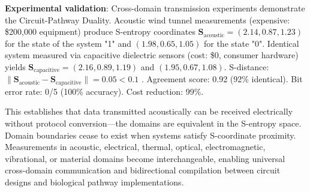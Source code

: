 \documentclass{article}
\theoremstyle{definition}
\theoremstyle{remark}
\begin{document}
\textbf{Experimental validation}: Cross-domain transmission experiments demonstrate the Circuit-Pathway Duality. Acoustic wind tunnel measurements (expensive: \$200,000 equipment) produce S-entropy coordinates $\mathbf{S}_{\text{acoustic}} = (2.14, 0.87, 1.23)$ for the state of the system "1" and $(1.98, 0.65, 1.05)$ for the state "0". Identical system measured via capacitive dielectric sensors (cost: \$0, consumer hardware) yields $\mathbf{S}_{\text{capacitive}} = (2.16, 0.89, 1.19)$ and $(1.95, 0.67, 1.08)$. S-distance: $\|\mathbf{S}_{\text{acoustic}} - \mathbf{S}_{\text{capacitive}}\| = 0.05 < 0.1$ \Checkmark. Agreement score: 0.92 (92\% identical). Bit error rate: 0/5 (100\% accuracy). Cost reduction: 99\%.

This establishes that data transmitted acoustically can be received electrically without protocol conversion—the domains are equivalent in the S-entropy space. Domain boundaries cease to exist when systems satisfy S-coordinate proximity. Measurements in acoustic, electrical, thermal, optical, electromagnetic, vibrational, or material domains become interchangeable, enabling universal cross-domain communication and bidirectional compilation between circuit designs and biological pathway implementations.
\end{document}
